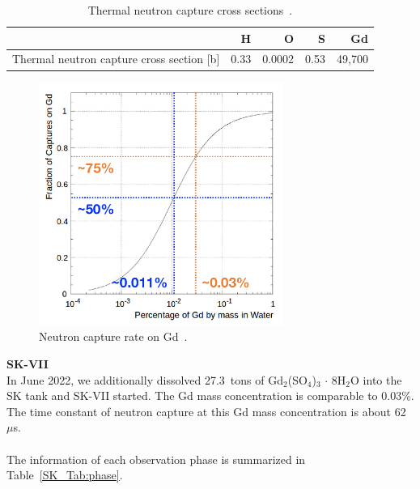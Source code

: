 \begin{table}[H]
	\caption[Thermal neutron capture cross sections]{
	Thermal neutron capture cross sections~\cite{2022MarkSlide}.
	}\label{SK_Tab:ThermalNeutron}
	\centering
	\vs
	\begin{tabular}{lrrrr} \hline\hline
		                                          & H    & O      & S    & Gd     \\ \hline
		Thermal neutron capture cross section [b] & 0.33 & 0.0002 & 0.53 & 49,700 \\ \hline\hline
	\end{tabular}
\end{table}

\begin{figure}[H]
	\centering
	\includegraphics[width=8cm]{Figures/SK/Gd_capture_rate}
	\caption[Neutron capture rate on Gd]{
	Neutron capture rate on Gd~\cite{2020Marti}.
	}\label{SK_Gd_capture_rate}
\end{figure}

\textbf{SK-VII}\\
\hs
In June 2022, we additionally dissolved 27.3~tons of Gd$_{\text{2}}$(SO$_{\text{4}}$)$_{\text{3}}\,\cdot\,$8H$_{\text{2}}$O into the SK tank and SK-VII started.
The Gd mass concentration is comparable to 0.03\%.
The time constant of neutron capture at this Gd mass concentration is about 62~$\mu$s.\\
\\
\hs
The information of each observation phase is summarized in Table~\ref{SK_Tab:phase}.

